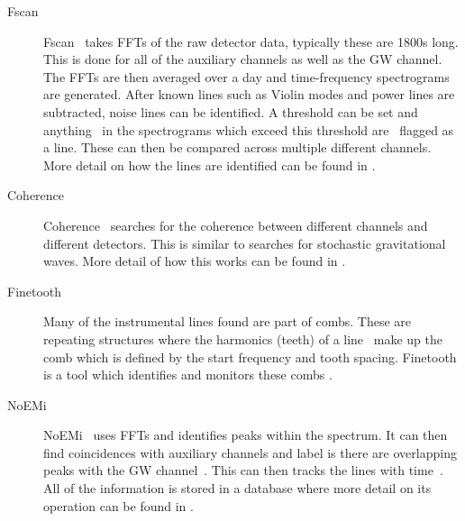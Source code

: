 \begin{description}
        \item[Fscan] Fscan~ \citep{coughlin2010NoiseLine}
takes \glspl{FFT} of the raw detector data, typically these are 1800s long.
This is done for all of the auxiliary channels as well as the \gls{GW} channel.
The \glspl{FFT} are then averaged over a day and time-frequency spectrograms
are generated. After known lines such as Violin modes and power lines are
subtracted, noise lines can be identified. A threshold can be set and
anything~
in the spectrograms which exceed this threshold are~ flagged as a line. These
can then be compared across multiple different channels. More detail on how the
lines are identified can be found in \citep{coughlin2010NoiseLine}.
	
        \item[Coherence] Coherence~ searches for the coherence between different
channels and different detectors. This is similar to searches for stochastic
gravitational waves. More detail of how this works can be found in
\citep{covas2018IdentificationMitigation}.~
	
        \item[Finetooth] Many of the instrumental lines found are part of
combs. These are repeating structures where the harmonics (teeth) of a
line~
make up the comb which is defined by the start frequency and tooth spacing.
Finetooth is a tool which identifies and monitors these combs
\citep{neunzertDailyComb}.
	
        \item[NoEMi] NoEMi~ uses \glspl{FFT} and identifies peaks within the
spectrum. It can then find coincidences with auxiliary channels and label is
there are overlapping peaks with the \gls{GW} channel~. This can then tracks the
lines with time~. All of the information is stored in a database where more
detail on its operation can be found in \citep{accadia2012NoEMiNoise}.~
	
\end{description}



